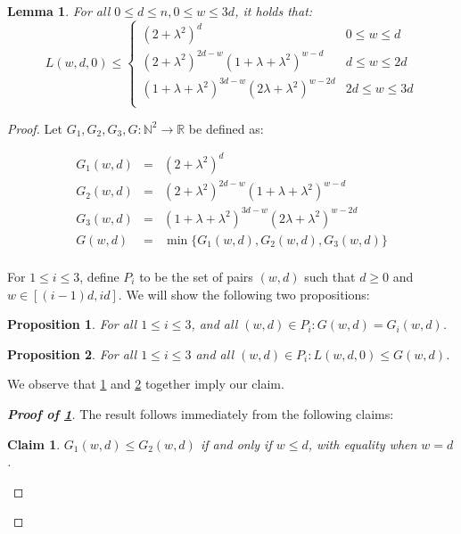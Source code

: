 \documentclass[10pt,a4paper]{article}
\newtheorem{lemma}{Lemma}
\newtheorem{proposition}{Proposition}
\newtheorem{claim}{Claim}
\newcommand{\N}{\mathbb{N}}
\newcommand{\R}{\mathbb{R}}
\begin{document}
\begin{lemma} 
\label{lem:Lwdo-0}
For all $0\le d\le n, 0\le w\le 3d$, it holds that:
\[
L(w,d,0) \le
\begin{cases}
(2+\lambda^2)^d & 0\le w \le d\\
(2+\lambda^2)^{2d-w}(1+\lambda+\lambda^2)^{w-d} & d\le w\le 2d\\
(1+\lambda+\lambda^2)^{3d-w}(2\lambda+\lambda^2)^{w-2d} & 2d\le w\le 3d\\
\end{cases}
\]
\end{lemma}

\begin{proof}

Let $G_1, G_2, G_3, G: \N^2\rightarrow \R$ be defined as:

\begin{eqnarray*}
G_1(w, d) & = & (2+\lambda^2)^d\\
G_2(w, d) & = & (2+\lambda^2)^{2d-w}(1+\lambda+\lambda^2)^{w-d}\\
G_3(w, d) & = & (1+\lambda+\lambda^2)^{3d-w}(2\lambda+\lambda^2)^{w-2d}\\
G(w, d) & = & \min\{G_1(w, d), G_2(w, d), G_3(w, d)\}\\
\end{eqnarray*}

For $1\le i\le 3$, define $P_i$ to be the set of pairs $(w, d)$ such that $d \ge 0$ and $w\in [(i-1)d, id]$. We will show the following two propositions:

\begin{proposition}
\label{prop:G}
For all $1\le i\le 3$, and all $(w, d)\in P_i: G(w, d) = G_i(w, d)$.
\end{proposition}

\begin{proposition}
\label{prop:L-sol-open-0}
For all $1\le i\le 3$ and all $(w, d)\in P_i: L(w, d, 0) \le G(w, d)$.
\end{proposition}

We observe that \cref{prop:G} and \cref{prop:L-sol-open-0} together imply our claim.

\begin{proof}[\textbf{Proof of \cref{prop:G}}]
The result follows immediately from the following claims:
\begin{claim}
\label{claim:G-sol-1}
$G_1(w,d) \leq G_2(w,d)$ if and only if $w \leq d$, with equality when $w=d$.
\end{claim}


\end{proof}
\end{proof}
\end{document}
